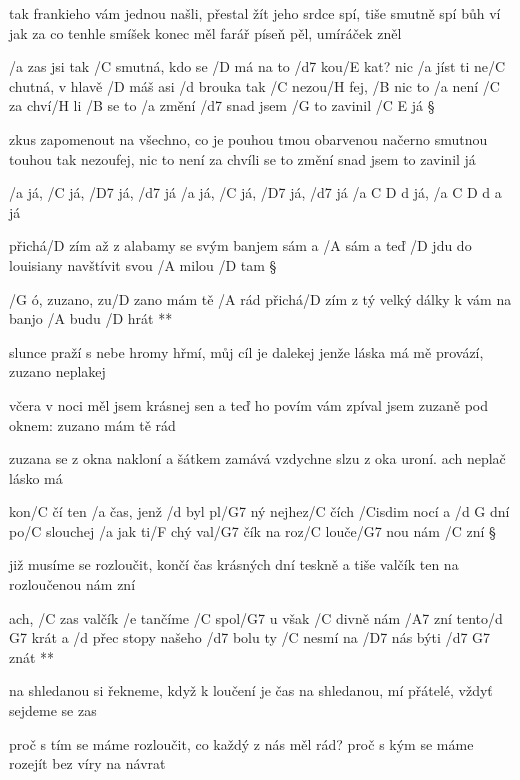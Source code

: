 tak frankieho vám jednou našli, přestal žít
jeho srdce spí, tiše smutně spí
bůh ví jak za co tenhle smíšek konec měl
farář píseň pěl, umíráček zněl




/a zas jsi tak /C smutná, kdo se /D má na to /d7 kou/E kat?
nic /a jíst ti ne/C chutná, v hlavě /D máš asi /d brouka
tak /C nezou/H fej, /B nic to /a není
/C za chví/H li /B se to /a změní
/d7 snad jsem /G to zavinil /{C E} já \S

zkus zapomenout na všechno, co je pouhou
tmou obarvenou načerno smutnou touhou
tak nezoufej, nic to není
za chvíli se to změní
snad jsem to zavinil já \s

/a já, /C já, /D7 já, /d7 já
/a já, /C já, /D7 já, /d7 já
/{a C D d} já, \quad\qquad /{a C D d a} já




přichá/D zím až z alabamy se svým banjem sám a /A sám
a teď /D jdu do louisiany navštívit svou /A milou /D tam \S

\R /G ó, zuzano, zu/D zano mám tě /A rád
   přichá/D zím z tý velký dálky k vám
   na banjo /A budu /D hrát **

slunce praží s nebe hromy hřmí, můj cíl je dalekej
jenže láska má mě provází, zuzano neplakej \s

včera v noci měl jsem krásnej sen a teď ho povím vám
zpíval jsem zuzaně pod oknem: zuzano mám tě rád \s

zuzana se z okna nakloní a šátkem zamává
vzdychne slzu z oka uroní. ach neplač lásko má




kon/C čí ten /a čas, jenž /d byl pl/G7 ný
nejhez/C čích /Cisdim nocí a /{d G} dní
po/C slouchej /a jak ti/F chý val/G7 čík
na roz/C louče/G7 nou nám /C zní \S

již musíme se rozloučit, končí čas krásných dní
teskně a tiše valčík ten na rozloučenou nám zní \s

\R ach, /C zas valčík /e tančíme /C spol/G7 u
   však /C divně nám /A7 zní tento/{d G7} krát
   a /d přec stopy našeho /d7 bolu
   ty /C nesmí na /D7 nás býti /{d7 G7} znát **

na shledanou si řekneme, když k loučení je čas
na shledanou, mí přátelé, vždyť sejdeme se zas \s

proč s tím se máme rozloučit, co každý z nás měl rád?
proč s kým se máme rozejít bez víry na návrat \s

